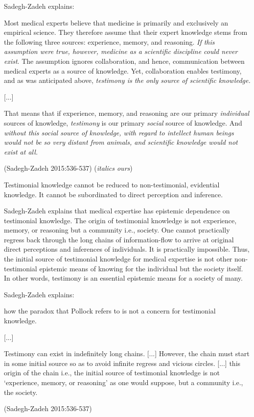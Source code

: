 Sadegh-Zadeh explains:
\begin{myquote}
Most medical experts believe that medicine is primarily and exclusively an empirical science.  They therefore assume that their expert knowledge stems from the following three sources: experience, memory, and reasoning. {\sl If this assumption were true, however, medicine as a scientific discipline could never exist}. The assumption ignores collaboration, and hence, communication between medical experts as a source of knowledge. Yet, collaboration enables testimony, and as was anticipated above, {\sl testimony is the only source of scientific knowledge.}

[...]

That means that if experience, memory, and reasoning are our primary {\sl individual} sources of knowledge, {\sl testimony} is our primary {\sl social} source of knowledge.  And {\sl without this social source of knowledge, with regard to intellect human beings would not be so very distant from animals, and scientific knowledge would not exist at all.}

\hfill (Sadegh-Zadeh 2015:536-537) ({\sl italics ours})
\end{myquote}

Testimonial knowledge cannot be reduced to non-testimonial, evidential knowledge. It cannot be subordinated to direct perception and inference.

Sadegh-Zadeh explains that medical expertise has epistemic dependence on testimonial knowledge.  The origin of testimonial knowledge is not experience, memory, or reasoning but a community i.e., society.  One cannot practically regress back through the long chains of information-flow to arrive at original direct perceptions and inferences of individuals.  It is practically impossible.  Thus, the initial source of testimonial knowledge for medical expertise is not other non-testimonial epistemic means of knowing for the individual but the society itself.  In other words, testimony is an essential epistemic means for a society of many.

Sadegh-Zadeh explains:
\begin{myquote}
how the paradox that Pollock refers to is not a concern for testimonial knowledge.  

[...]

Testimony can exist in indefinitely long chains. [...]  However, the chain must start in some initial source so as to avoid infinite regress and vicious circles.  [...] this origin of the chain i.e., the initial source of testimonial knowledge is not `experience, memory, or reasoning' as one would suppose, but a community i.e., the society.

\hfill (Sadegh-Zadeh 2015:536-537)
\end{myquote}

